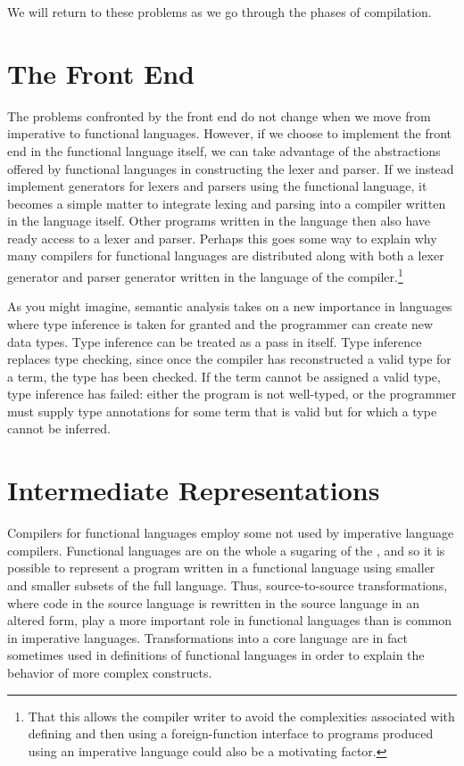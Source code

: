 We will return to these problems as we go through the phases of compilation.

\section{The Front End}
The problems confronted by the front end do not change when we move from imperative to functional languages. However, if we choose to implement the front end in the functional language itself, we can take advantage of the abstractions offered by functional languages in constructing the lexer and parser. If we instead implement generators for lexers and parsers using the functional language, it becomes a simple matter to integrate lexing and parsing into a compiler written in the language itself. Other programs written in the language then also have ready access to a lexer and parser. Perhaps this goes some way to explain why many compilers for functional languages are distributed along with both a lexer generator and parser generator written in the language of the compiler.\footnote{That this allows the compiler writer to avoid the complexities associated with defining and then using a foreign-function interface to programs produced using an imperative language could also be a motivating factor.}

As you might imagine, semantic analysis takes on a new importance in languages where type inference is taken for granted and the programmer can create new data types. Type inference can be treated as a pass in itself. Type inference replaces type checking, since once the compiler has reconstructed a valid type for a term, the type has been checked. If the term cannot be assigned a valid type, type inference has failed: either the program is not well-typed, or the programmer must supply type annotations for some term that is valid but for which a type cannot be inferred.

\section{Intermediate Representations}
Compilers for functional languages employ some \IRs not used by imperative language compilers. Functional languages are on the whole a sugaring of the \lambdacalc{}, and so it is possible to represent a program written in a functional language using smaller and smaller subsets of the full language. Thus, source-to-source transformations, where code in the source language is rewritten in the source language in an altered form, play a more important role in functional languages than is common in imperative languages. Transformations into a core language are in fact sometimes used in definitions of functional languages in order to explain the behavior of more complex constructs.

